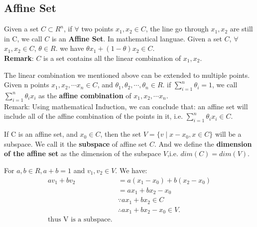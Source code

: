 \subsection{Affine Set}
\begin{Definition}{1}{2}
Given a set $C \subset R^n$, if $\forall$ two points $x_1,x_2 \in C$, the line go through  $x_1,x_2$ are still in C, we call $C$ is an \textbf{Affine Set}.
In mathematical languae. Given a set $C$, $\forall$ $x_1,x_2 \in C$, $\theta \in R$. we have $\theta x_1+ (1-\theta)x_2 \in C$.\\
\textbf{Remark}: $C$ is a set contains all the linear combination of $x_1,x_2$.
\end{Definition}

\begin{Definition}{1}{3}
The linear combination we mentioned above can be extended to multiple points. Given n points $x_1,x_2,\cdots x_n \in C$, and $\theta_1,\theta_2,\cdots,\theta_n \in R$. if $\sum_{i=1}^n \theta_i=1$, we call $\sum_{i=1}^n \theta_i x_i$ as the \textbf{affine combination} of $x_1,x_2,\cdots x_n$.\\
Remark: Using mathematical Induction, we can conclude that: an affine set will include all of the affine combination of the points in it, i.e. $\sum_{i=1}^n\theta_i x_i \in C$. 
\end{Definition}

\begin{Definition}{1}{4}
If C is an affine set, and $x_0 \in C$, then the set $V=\{v\mid x-x_0, x\in C\}$ will be a subspace. We call it the \textbf{subspace} of affine set $C$. And we define the \textbf{dimension of the affine set} as the dimension of the subspace $V$,i.e. $dim(C)=dim(V)$. 
\end{Definition}

\begin{Proof}{1}{4}
For $a,b\in R,a+b=1$ and $v_1,v_2 \in V$. We have:\\
$$
\begin{aligned}
av_1 + bv_2 &= a(x_1-x_0)+b(x_2-x_0)\\
&=ax_1+bx_2-x_0\\
&\because ax_1+bx_2 \in C\\
&\therefore ax_1+bx_2-x_0 \in V.\\
\text{thus V is a subspace.}
\end{aligned}
$$
\end{Proof}
